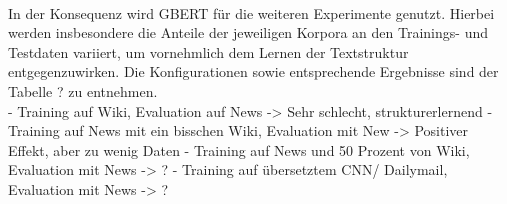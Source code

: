 \noindent{}\\


\noindent
In der Konsequenz wird \ac{GBERT} für die weiteren Experimente genutzt. Hierbei werden insbesondere die Anteile der jeweiligen Korpora an den Trainings- und Testdaten variiert, um vornehmlich dem Lernen der Textstruktur entgegenzuwirken. Die Konfigurationen sowie entsprechende Ergebnisse sind der Tabelle ? zu entnehmen.\\


\noindent
- Training auf Wiki, Evaluation auf News
  -> Sehr schlecht, strukturerlernend
- Training auf News mit ein bisschen Wiki, Evaluation mit New
   -> Positiver Effekt, aber zu wenig Daten
- Training auf News und 50 Prozent von Wiki, Evaluation mit News
  -> ?
- Training auf übersetztem CNN/ Dailymail, Evaluation mit News
  -> ?




